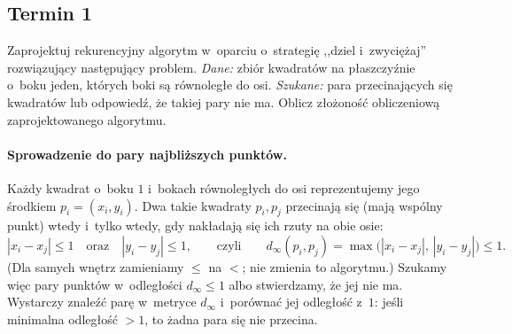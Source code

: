 \subsection{Termin 1}

\begin{zadanie}
	Zaprojektuj rekurencyjny algorytm w~oparciu o~strategię ,,dziel i~zwyciężaj''
	rozwiązujący następujący problem. \emph{Dane:} zbiór kwadratów na płaszczyźnie
	o~boku jeden, których boki są równoległe do osi. \emph{Szukane:} para
	przecinających się kwadratów lub odpowiedź, że takiej pary nie ma. Oblicz
	złożoność obliczeniową zaprojektowanego algorytmu.
\end{zadanie}

\paragraph{Sprowadzenie do pary najbliższych punktów.}
Każdy kwadrat o~boku $1$ i~bokach równoległych do osi reprezentujemy jego
środkiem $p_i=(x_i,y_i)$. Dwa takie kwadraty $p_i,p_j$ przecinają się (mają
wspólny punkt) wtedy i~tylko wtedy, gdy nakładają się ich rzuty na obie osie:
\[
	|x_i-x_j|\leq 1 \quad\text{oraz}\quad |y_i-y_j|\leq 1,
	\qquad\text{czyli}\qquad
	d_\infty(p_i,p_j)=\max\big(|x_i-x_j|,\,|y_i-y_j|\big)\leq 1.
\]
(Dla samych wnętrz zamieniamy $\leq$ na $<$; nie zmienia to algorytmu.) Szukamy
więc pary punktów w~odległości $d_\infty\leq 1$ albo stwierdzamy, że jej nie ma.
Wystarczy znaleźć parę  w~metryce $d_\infty$ i~porównać jej
odległość z~$1$: jeśli minimalna odległość $>1$, to żadna para się nie przecina.


